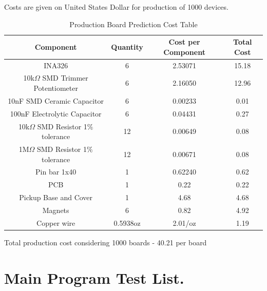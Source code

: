 \begin{annexesenv}
Costs are given on United States Dollar for production of 1000 devices.\\
\begin{table}[htb]
  \begin{center}
    \ABNTEXreducedfont
    \caption[Production Board Prediction Cost Table]{Production Board Prediction Cost Table}
    \label{Production-cost}
    \begin{tabular}{c|c|c|c}
      \textbf{Component} & \textbf{Quantity} & \textbf{Cost per Component} & \textbf{Total Cost} \\
     \hline
     \hline
    INA326 & 6 & 2.53071 & 15.18\\ \hline
    10k$\Omega$ SMD Trimmer Potentiometer & 6 & 2.16050 & 12.96 \\ \hline
    10nF SMD Ceramic Capacitor & 6 & 0.00233 & 0.01 \\ \hline
    100nF Electrolytic Capacitor & 6 & 0.04431 & 0.27 \\ \hline
    10k$\Omega$ SMD Resistor 1$\%$ tolerance & 12 & 0.00649 & 0.08 \\ \hline
    1M$\Omega$ SMD Resistor 1$\%$ tolerance & 12 & 0.00671 & 0.08 \\ \hline
    Pin bar 1x40 & 1 & 0.62240 & 0.62 \\ \hline
    PCB & 1 & 0.22 & 0.22 \\ \hline
    Pickup Base and Cover & 1 & 4.68 & 4.68 \\ \hline
    Magnets & 6 & 0.82 & 4.92  \\ \hline
    Copper wire & 0.5938oz & 2.01/oz & 1.19  \\ \hline
  \end{tabular}
\end{center}
\end{table}

Total production cost considering 1000 boards - 40.21 per board

\chapter{Main Program Test List.}
\label{test-list}


\end{annexesenv}
